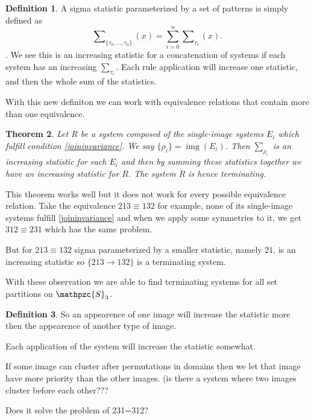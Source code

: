 \documentclass[a4paper, 11pt]{article}
\newtheorem{theorem}{Theorem}[section]
\theoremstyle{definition}
\newtheorem{definition}[theorem]{Definition}
\newcommand{\Sym}{\mathpzc{S}}
\DeclareMathOperator{\img}{img}
\begin{document}
\begin{definition}
    A sigma statistic parameterized by a set of patterns is simply defined as
    $$
        \sum\nolimits_{\{\tau_0, ..., \tau_n\}}(x) = \sum_{i=0}^{n} \sum\nolimits_{\tau_i}(x).
    $$.
    We see this is an increasing statistic for a concatenation of systems if
    each system has an increasing $\sum_{\tau_i}$.  Each rule application will
    increase one statistic, and then the whole sum of the statistics.
\end{definition}

With this new definiton we can work with equivalence relations that contain more than one
equivalence.

\begin{theorem}
    Let $R$ be a system composed of the single-image systems $E_i$ which fulfill
    condition \eqref{joininvariance}. We say $\{\rho_i\} = \img(E_i)$. Then $\sum\nolimits_{\rho_i}$ 
    is an increasing statistic for each $E_i$ and then by summing these
    statistics together we have an increasing statistic for $R$.
    The system $R$ is hence terminating.
\end{theorem}

This theorem works well but it does not work for every possible equivalence relation.
Take the equivalence $213 \equiv 132$ for example, none of its single-image systems fulfill
\eqref{joininvariance} and when we apply some symmetries to it, we get $312
\equiv 231$ which has the same problem.

But for $213 \equiv 132$ sigma parameterized by a smaller statistic, namely $21$, is an
increasing statistic so $\{ 213 \to 132 \}$ is a terminating system.

With these observation we are able to find terminating systems for all set
partitions on $\Sym_3$.

\begin{definition}
    So an appearence of one image will increase the statistic more then the
    appearence of another type of image.

    Each application of the system will increase the statistic somewhat.

    If some image can cluster after permutations in domains then we let that
    image have more priority than the other images. (is there a system where two
    images cluster before each other???

    Does it solve the problem of 231=312?
\end{definition}
\end{document}
